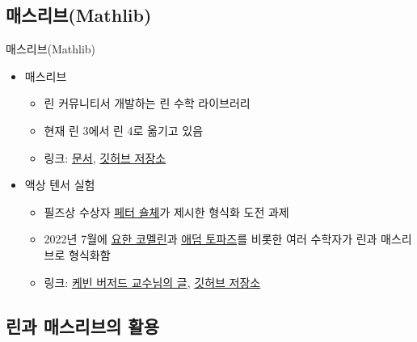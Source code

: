 \documentclass{beamer}
\begin{document}
\subsection{매스리브(Mathlib)}

\begin{frame}{매스리브(Mathlib)}
  \begin{itemize}
    \item 매스리브
    \begin{itemize}
      \item 린 커뮤니티서 개발하는 린 수학 라이브러리
      \item 현재 린 3에서 린 4로 옮기고 있음
      \item 링크:
        \href{https://leanprover-community.github.io/mathlib4_docs/}{문서},
        \href{https://github.com/leanprover-community/mathlib4/}{깃허브 저장소}
    \end{itemize}
    \item 액상 텐서 실험
    \begin{itemize}
      \item 필즈상 수상자
        \href{https://people.mpim-bonn.mpg.de/scholze/}{페터 숄체}가 제시한
        형식화 도전 과제
      \item 2022년 7월에 \href{https://math.commelin.net/}{요한 코멜린}과
        \href{https://adamtopaz.com/}{애덤 토파즈}를 비롯한 여러 수학자가 린과
        매스리브로 형식화함
      \item 링크:
        \href{https://xenaproject.wordpress.com/2022/09/12/beyond-the-liquid-tensor-experiment/}{케빈
          버저드 교수님의 글},
        \href{https://github.com/leanprover-community/lean-liquid}{깃허브 저장소}
    \end{itemize}
  \end{itemize}
\end{frame}

\subsection{린과 매스리브의 활용}
\end{document}
